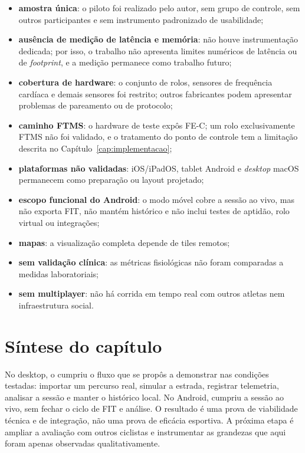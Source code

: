 \begin{itemize}
    \item \textbf{amostra única}: o piloto foi realizado pelo autor, sem grupo
        de controle, sem outros participantes e sem instrumento padronizado de
        usabilidade;
    \item \textbf{ausência de medição de latência e memória}: não houve
        instrumentação dedicada; por isso, o trabalho não apresenta limites
        numéricos de latência ou de \textit{footprint}, e a medição permanece
        como trabalho futuro;
    \item \textbf{cobertura de hardware}: o conjunto de rolos, sensores de
        frequência cardíaca e demais sensores foi restrito; outros fabricantes
        podem apresentar problemas de pareamento ou de protocolo;
    \item \textbf{caminho FTMS}: o hardware de teste expôs FE-C; um rolo
        exclusivamente FTMS não foi validado, e o tratamento do ponto de
        controle tem a limitação descrita no Capítulo~\ref{cap:implementacao};
    \item \textbf{plataformas não validadas}: iOS/iPadOS, tablet Android e
        \textit{desktop} macOS permanecem como preparação ou layout projetado;
    \item \textbf{escopo funcional do Android}: o modo móvel cobre a sessão ao
        vivo, mas não exporta FIT, não mantém histórico e não inclui testes de
        aptidão, rolo virtual ou integrações;
    \item \textbf{mapas}: a visualização completa depende de tiles remotos;
    \item \textbf{sem validação clínica}: as métricas fisiológicas não foram
        comparadas a medidas laboratoriais;
    \item \textbf{sem multiplayer}: não há corrida em tempo real com outros
        atletas nem infraestrutura social.
\end{itemize}

\section{Síntese do capítulo}
\label{sec:sintese-resultados}

No desktop, o \argus{} cumpriu o fluxo que se propôs a demonstrar nas condições
testadas: importar um percurso real, simular a estrada, registrar telemetria,
analisar a sessão e manter o histórico local. No Android, cumpriu a sessão ao
vivo, sem fechar o ciclo de FIT e análise. O resultado é uma prova de viabilidade
técnica e de integração, não uma prova de eficácia esportiva. A próxima etapa é
ampliar a avaliação com outros ciclistas e instrumentar as grandezas que aqui
foram apenas observadas qualitativamente.
